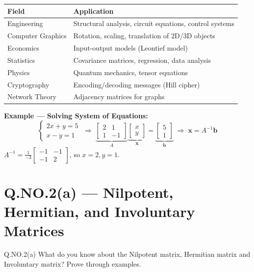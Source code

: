 \documentclass[12pt]{article}
\newcommand{\hcell}[1]{\textbf{\color{white}#1}}
\newcommand{\mat}[1]{\begin{bmatrix}#1\end{bmatrix}}
\begin{document}
\begin{center}
\renewcommand{\arraystretch}{1.4}
\begin{tabular}{|C{3.5cm}|C{9cm}|}
\hline
{}
\hcell{Field} & \hcell{Application} \\
\hline
Engineering & Structural analysis, circuit equations, control systems \\
Computer Graphics & Rotation, scaling, translation of 2D/3D objects \\
Economics & Input-output models (Leontief model) \\
Statistics & Covariance matrices, regression, data analysis \\
Physics & Quantum mechanics, tensor equations \\
Cryptography & Encoding/decoding messages (Hill cipher) \\
Network Theory & Adjacency matrices for graphs \\
\hline
\end{tabular}
\end{center}

\begin{keybox}
\textbf{Example — Solving System of Equations:}
\[
  \begin{cases} 2x + y = 5 \\ x - y = 1 \end{cases}
  \;\Longrightarrow\;
  \underbrace{\mat{2&1\\1&-1}}_{A}\underbrace{\mat{x\\y}}_{\mathbf{x}} = \underbrace{\mat{5\\1}}_{\mathbf{b}}
  \;\Longrightarrow\;
  \mathbf{x} = A^{-1}\mathbf{b}
\]
$A^{-1} = \frac{1}{-3}\mat{-1&-1\\-1&2}$, so $x = 2, y = 1$.
\end{keybox}

\newpage

\section{Q.NO.2(a) — Nilpotent, Hermitian, and Involuntary Matrices}

\begin{qbox}{Q.NO.2(a)}
What do you know about the Nilpotent matrix, Hermitian matrix and Involuntary matrix? Prove through examples.
\end{qbox}
\end{document}
